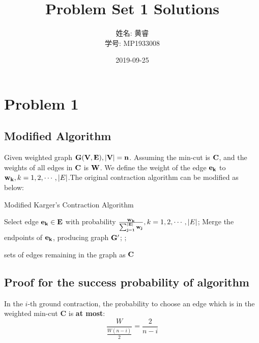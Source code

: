 \documentclass[a4paper, 12pt, titlepage]{article}
\title{Problem Set 1 Solutions}
\author{姓名: 黄睿 \\ 学号: MP1933008}
\date{2019-09-25}
\begin{document}

\section{Problem 1}

\subsection{Modified Algorithm}

Given weighted graph ${\bf G(V, E), |V| = n}$. Assuming the min-cut is ${\bf C}$, and the weights of all edges in ${\bf C}$ is ${\bf W}$.
We define the weight of the edge ${\bf e_k}$ to ${\bf w_{k}}, k = 1, 2, \cdots, |E|$.The original contraction algorithm can be modified as below:
\begin{algorithm}[h]
    \caption{Modified Karger's Contraction Algorithm}
    \begin{algorithmic}[1]

            \State Select edge ${\bf e_{k}} \in {\bf E}$ with probability ${\bf \frac{w_{k}}{\sum_{j = 1}^{|E|} w_{j}}}, k = 1, 2, \cdots, |E|$;
            \State Merge the endpoints of ${\bf e_{k}}$, producing graph ${\bf G'}$;
            ;
        \EndWhile

        \State \Return sets of edges remaining in the graph as ${\bf C}$
        \EndFunction
    \end{algorithmic}
\end{algorithm}


\subsection{Proof for the success probability of algorithm}

In the $i$-th ground contraction, the probability to choose an edge which is in the weighted min-cut {\bf C} is {\bf at most}:
\[
    \frac{W}{\frac{W (n - i)}{2}} = \frac{2}{n - i}
\]
\end{document}
